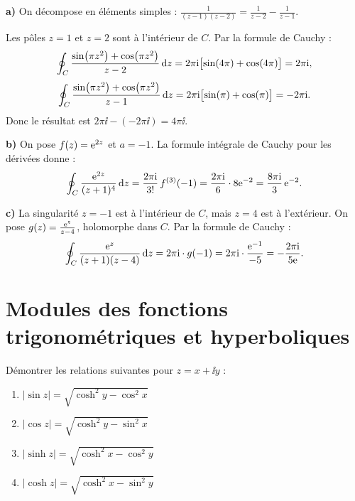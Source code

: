 \documentclass[12pt,a4paper]{article}
\begin{document}
\begin{boitecorrige}

\textbf{a)} On décompose en éléments simples : $\tfrac{1}{(z-1)(z-2)} = \tfrac{1}{z-2}-\tfrac{1}{z-1}$.

Les pôles $z=1$ et $z=2$ sont à l'intérieur de $C$. Par la formule de Cauchy :
\[
\oint_C\frac{\sin(\pi z^2)+\cos(\pi z^2)}{z-2}\,\mathrm{d} z = 2\pi\mathrm{i}\bigl[\sin(4\pi)+\cos(4\pi)\bigr] = 2\pi\mathrm{i},
\]
\[
\oint_C\frac{\sin(\pi z^2)+\cos(\pi z^2)}{z-1}\,\mathrm{d} z = 2\pi\mathrm{i}\bigl[\sin(\pi)+\cos(\pi)\bigr] = -2\pi\mathrm{i}.
\]
Donc le résultat est $2\pi\ii - (-2\pi\ii) = 4\pi\ii$.

\textbf{b)} On pose $f(z) = \mathrm{e}^{2z}$ et $a = -1$. La formule intégrale de Cauchy pour les dérivées donne :
\[
\oint_C\frac{\mathrm{e}^{2z}}{(z+1)^4}\,\mathrm{d} z = \frac{2\pi\mathrm{i}}{3!}\,f^{(3)}(-1) = \frac{2\pi\mathrm{i}}{6}\cdot 8\mathrm{e}^{-2} = \frac{8\pi\mathrm{i}}{3}\,\mathrm{e}^{-2}.
\]

\textbf{c)} La singularité $z=-1$ est à l'intérieur de $C$, mais $z=4$ est à l'extérieur. On pose $g(z) = \tfrac{\mathrm{e}^z}{z-4}$, holomorphe dans $C$. Par la formule de Cauchy :
\[
\oint_C\frac{\mathrm{e}^z}{(z+1)(z-4)}\,\mathrm{d} z = 2\pi\mathrm{i}\cdot g(-1) = 2\pi\mathrm{i}\cdot\frac{\mathrm{e}^{-1}}{-5} = -\frac{2\pi\mathrm{i}}{5\mathrm{e}}.
\]
\end{boitecorrige}

\section{Modules des fonctions trigonométriques et hyperboliques}

\begin{boiteexercice}
\niveau{\moyen}
Démontrer les relations suivantes pour $z = x + \ii y$ :
\begin{enumerate}[label=\alph*)]
  \item $|\sin z| = \sqrt{\cosh^2 y - \cos^2 x}$
  \item $|\cos z| = \sqrt{\cosh^2 y - \sin^2 x}$
  \item $|\sinh z| = \sqrt{\cosh^2 x - \cos^2 y}$
  \item $|\cosh z| = \sqrt{\cosh^2 x - \sin^2 y}$
\end{enumerate}
\end{boiteexercice}
\end{document}
